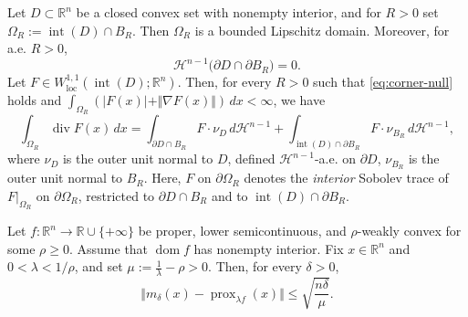 \documentclass[10pt,a4paper]{amsart}
\begin{document}
\begin{lemma}\label{co-area}
Let $D\subset \mathbb{R}^n$ be a closed convex set with nonempty interior, and for $R>0$ set $\Omega_R:=\operatorname{int}(D)\cap B_R$. Then $\Omega_R$ is a bounded Lipschitz domain. Moreover, for a.e. $R>0$,  
\begin{equation}\label{eq:corner-null}
\mathcal{H}^{n-1}\big(\partial D\cap \partial B_R\big)=0.    
\end{equation}
Let $F\in W^{1,1}_{\operatorname{loc}}(\operatorname{int}(D);\mathbb{R}^n)$. Then, for every $R>0$ such that \eqref{eq:corner-null} holds and $\int_{\Omega_{R}}(\vert F(x)\vert +\Vert \nabla F(x)\Vert)\,dx<\infty$, we have
\begin{equation*}
\int_{\Omega_R}\operatorname{div}F(x)\,dx
=
\int_{\partial D\cap B_R}F\cdot \nu_D\,d\mathcal{H}^{n-1}
+
\int_{\operatorname{int}(D)\cap \partial B_R} F\cdot \nu_{B_R}\,d\mathcal{H}^{n-1},
\end{equation*}
where $\nu_D$ is the outer unit normal to $D$, defined $\mathcal{H}^{n-1}$-a.e. on $\partial D$,
$\nu_{B_R}$ is the outer unit normal to $B_R$. Here, $F$ on $\partial\Omega_R$ denotes the \emph{interior} Sobolev trace of $F|_{\Omega_R}$ on $\partial\Omega_R$,
restricted to $\partial D\cap B_R$ and to $\operatorname{int}(D)\cap \partial B_R$.
\end{lemma}

\begin{theorem}\label{convergence}
   Let $f\colon \mathbb{R}^n \to \mathbb{R}\cup \{+\infty\}$ be proper, lower semicontinuous,  and $\rho$-weakly convex for some $\rho\geq 0$.  Assume that $\operatorname{dom}f$ has nonempty interior. Fix $x\in \mathbb{R}^n$ and $0<\lambda <1/\rho$, and set $\mu:=\frac{1}{\lambda}-\rho>0$. 
Then, for every $\delta>0$,
$$
\Vert m_{\delta}(x)-\operatorname{prox}_{\lambda f}(x)\Vert \leq \sqrt{\frac{n\delta}{\mu}}.
$$
\end{theorem}
\end{document}
